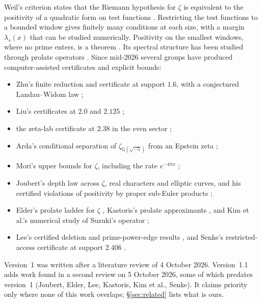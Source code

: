 \documentclass[11pt]{article}
\theoremstyle{remark}
\begin{document}
Weil's criterion states that the Riemann hypothesis for $\zeta$ is equivalent to the positivity of a quadratic form on test functions \cite{weil52,bombieri00,yoshida92}. Restricting the test functions to a bounded window gives finitely many conditions at each size, with a margin $\lambda_s(x)$ that can be studied numerically. Positivity on the smallest windows, where no prime enters, is a theorem \cite{cc21}. Its spectral structure has been studied through prolate operators \cite{cc23,ccm24,ccm25,connes26}. Since mid-2026 several groups have produced computer-assisted certificates and explicit bounds:
\begin{itemize}
\item Zhu's finite reduction and certificate at support $1.6$, with a conjectured Landau--Widom law \cite{zhu26};
\item Liu's certificates at $2.0$ and $2.125$ \cite{liu26};
\item the zeta-lab certificate at $2.38$ in the even sector \cite{zetalab258};
\item Arda's conditional separation of $\zeta_{\mathbb Q(\sqrt{-5})}$ from an Epstein zeta \cite{arda631};
\item Mori's upper bounds for $\zeta$, including the rate $e^{-4\pi x}$ \cite{mori26a,mori26b,mori26c,mori26d};
\item Joubert's depth law across $\zeta$, real characters and elliptic curves, and his certified violations of positivity by proper sub-Euler products \cite{joubert26};
\item Elder's prolate ladder for $\zeta$ \cite{elder26}, Kastoris's prolate approximants \cite{kastoris26}, and Kim et al.'s numerical study of Suzuki's operator \cite{kim26};
\item Lee's certified deletion and prime-power-edge results \cite{lee26a,lee26b}, and Senke's restricted-access certificate at support $2.406$ \cite{senke26}.
\end{itemize}
Version~1 was written after a literature review of 4 October 2026. Version~1.1 adds work found in a second review on 5 October 2026, some of which predates version~1 (Joubert, Elder, Lee, Kastoris, Kim et al., Senke). It claims priority only where none of this work overlaps; \S\ref{sec:related} lists what is ours.
\end{document}
